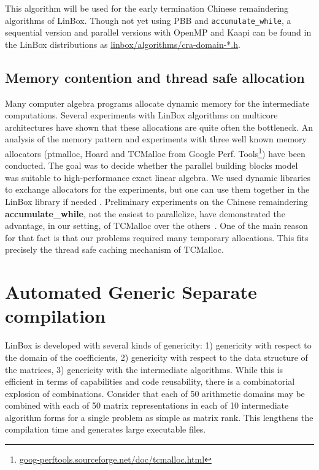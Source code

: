 \documentclass[runningheads,a4paper]{llncs}
\newcommand{\linbox}{{\sc LinBox}\xspace}
\begin{document}
  This algorithm will be used 
  for the early termination Chinese remaindering algorithms of
  \linbox. Though not yet using PBB and \texttt{accumulate\_while}, a
  sequential version and parallel versions with OpenMP and
  Kaapi can be found in the \linbox distributions as 
  \url{linbox/algorithms/cra-domain-*.h}.



\subsection{Memory contention and thread safe allocation}
Many computer algebra programs allocate dynamic memory for the
intermediate computations. Several experiments with \linbox
algorithms on multicore architectures have shown that these
allocations are quite often the bottleneck.
An analysis of the memory pattern and experiments with three well
known memory allocators 
(ptmalloc, Hoard and TCMalloc from Google Perf. Tools\footnote{\url{goog-perftools.sourceforge.net/doc/tcmalloc.html}})
have been conducted. The goal was to decide whether the parallel
building blocks model was suitable to high-performance exact linear
algebra. We used dynamic libraries to exchange allocators for the
experiments, but one can use them together in the \linbox library if
needed \cite[\S 7]{kaltofen:2005:memory}.
%
Preliminary experiments on the Chinese remaindering {\bf accumulate\_while},
not the easiest to parallelize, have demonstrated the advantage, in
our setting, of TCMalloc over the others~\cite{jgd:2010:crt}.
One of the main reason for that fact is that our problems required
many temporary allocations. This fits precisely the thread safe caching
mechanism of TCMalloc.
%
\section{Automated Generic Separate compilation}
\linbox is developed with several kinds of genericity:
1) genericity with respect to the domain of the coefficients,
2) genericity with respect to the data structure of the matrices,
3) genericity with the intermediate algorithms.
While this is efficient in terms of capabilities and code reusability, there is a combinatorial explosion of combinations.  Consider that each of 50 arithmetic domains may be combined with each of 50 matrix representations in each of 10 intermediate algorithm forms for a single problem as simple as matrix rank. This
lengthens the compilation time and generates large executable files.
\end{document}
